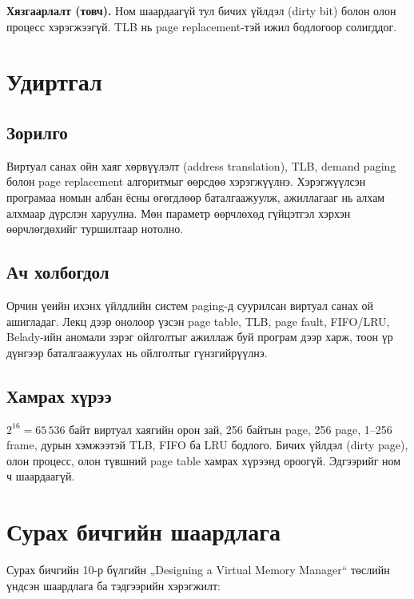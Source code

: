 \keyresults

\textbf{Хязгаарлалт (товч).} Ном шаардаагүй тул бичих үйлдэл (dirty bit) болон олон процесс хэрэгжээгүй. TLB нь page replacement-тэй ижил бодлогоор солигддог.

\section{Удиртгал}
\subsection{Зорилго}
Виртуал санах ойн хаяг хөрвүүлэлт (address translation), TLB, demand paging болон page replacement алгоритмыг өөрсдөө хэрэгжүүлнэ. Хэрэгжүүлсэн програмаа номын албан ёсны өгөгдлөөр баталгаажуулж, ажиллагааг нь алхам алхмаар дүрслэн харуулна. Мөн параметр өөрчлөхөд гүйцэтгэл хэрхэн өөрчлөгдөхийг туршилтаар нотолно.
\subsection{Ач холбогдол}
Орчин үеийн ихэнх үйлдлийн систем paging-д суурилсан виртуал санах ой ашигладаг. Лекц дээр онолоор үзсэн page table, TLB, page fault, FIFO/LRU, Belady-ийн аномали зэрэг ойлголтыг ажиллаж буй програм дээр харж, тоон үр дүнгээр баталгаажуулах нь ойлголтыг гүнзгийрүүлнэ.
\subsection{Хамрах хүрээ}
$2^{16}=65\,536$ байт виртуал хаягийн орон зай, 256 байтын page, 256 page, 1–256 frame, дурын хэмжээтэй TLB, FIFO ба LRU бодлого. Бичих үйлдэл (dirty page), олон процесс, олон түвшний page table хамрах хүрээнд ороогүй. Эдгээрийг ном ч шаардаагүй.

\section{Сурах бичгийн шаардлага}
Сурах бичгийн 10-р бүлгийн „Designing a Virtual Memory Manager“ төслийн үндсэн шаардлага ба тэдгээрийн хэрэгжилт:

